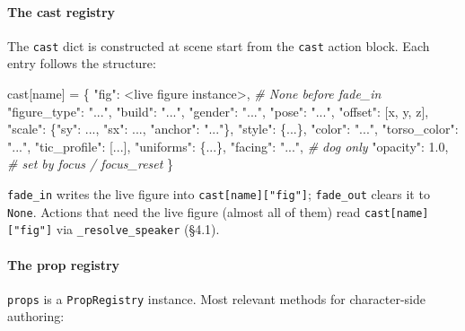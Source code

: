 \documentclass[
  12pt,
  letterpaper,
]{book}
\newenvironment{Shaded}{}{}
\newcommand{\CommentTok}[1]{\textcolor[rgb]{0.38,0.63,0.69}{\textit{#1}}}
\newcommand{\FloatTok}[1]{\textcolor[rgb]{0.25,0.63,0.44}{#1}}
\newcommand{\NormalTok}[1]{#1}
\newcommand{\OperatorTok}[1]{\textcolor[rgb]{0.40,0.40,0.40}{#1}}
\newcommand{\StringTok}[1]{\textcolor[rgb]{0.25,0.44,0.63}{#1}}
\begin{document}
\paragraph{The cast registry}\label{the-cast-registry}

The \texttt{cast} dict is constructed at scene start from the
\texttt{cast} action block. Each entry follows the structure:

\begin{Shaded}
\begin{Highlighting}[]
\NormalTok{cast[name] }\OperatorTok{=}\NormalTok{ \{}
    \StringTok{"fig"}\NormalTok{:         }\OperatorTok{\textless{}}\NormalTok{live figure instance}\OperatorTok{\textgreater{}}\NormalTok{,  }\CommentTok{\# None before fade\_in}
    \StringTok{"figure\_type"}\NormalTok{: }\StringTok{"..."}\NormalTok{,}
    \StringTok{"build"}\NormalTok{:       }\StringTok{"..."}\NormalTok{,}
    \StringTok{"gender"}\NormalTok{:      }\StringTok{"..."}\NormalTok{,}
    \StringTok{"pose"}\NormalTok{:        }\StringTok{"..."}\NormalTok{,}
    \StringTok{"offset"}\NormalTok{:      [x, y, z],}
    \StringTok{"scale"}\NormalTok{:       \{}\StringTok{"sy"}\NormalTok{: ..., }\StringTok{"sx"}\NormalTok{: ..., }\StringTok{"anchor"}\NormalTok{: }\StringTok{"..."}\NormalTok{\},}
    \StringTok{"style"}\NormalTok{:       \{...\},}
    \StringTok{"color"}\NormalTok{:       }\StringTok{"..."}\NormalTok{,}
    \StringTok{"torso\_color"}\NormalTok{: }\StringTok{"..."}\NormalTok{,}
    \StringTok{"tic\_profile"}\NormalTok{: [...],}
    \StringTok{"uniforms"}\NormalTok{:    \{...\},}
    \StringTok{"facing"}\NormalTok{:      }\StringTok{"..."}\NormalTok{,     }\CommentTok{\# dog only}
    \StringTok{"opacity"}\NormalTok{:     }\FloatTok{1.0}\NormalTok{,       }\CommentTok{\# set by focus / focus\_reset}
\NormalTok{\}}
\end{Highlighting}
\end{Shaded}

\texttt{fade\_in} writes the live figure into
\texttt{cast{[}name{]}{[}"fig"{]}}; \texttt{fade\_out} clears it to
\texttt{None}. Actions that need the live figure (almost all of them)
read \texttt{cast{[}name{]}{[}"fig"{]}} via \texttt{\_resolve\_speaker}
(§4.1).

\paragraph{The prop registry}\label{the-prop-registry}

\texttt{props} is a \texttt{PropRegistry} instance. Most relevant
methods for character-side authoring:
\end{document}
